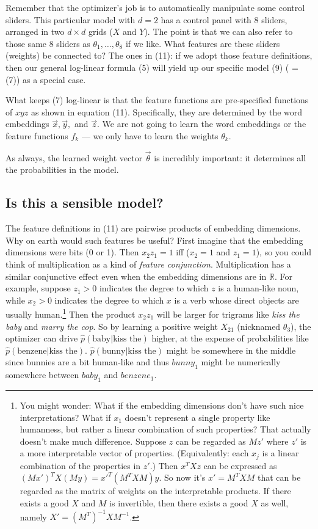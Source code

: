 Remember that the optimizer’s job is to automatically manipulate some control sliders. This particular model with $d=2$ has a control panel with 8 sliders, arranged in two $d \times d$ grids ($X$ and $Y$). The point is that we can also refer to those same 8 sliders as $\theta_1,\ldots,\theta_8$ if we like. What features are these sliders (weights) be connected to? The ones in (11): if we adopt those feature definitions, then our general log-linear formula (5) will yield up our specific model (9) ( = (7)) as a special case. 

What keeps (7) log-linear is that the feature functions are pre-specified functions of $xyz$ as shown in equation (11). Specifically, they are determined by the word embeddings $\vec{x}, \vec{y},$ and $\vec{z}$. We are not going to learn the word embeddings or the feature functions $f_k$ — we only have to learn the weights $\theta_k$.  

As always, the learned weight vector $\vec{\theta}$ is incredibly important: it determines all the probabilities in the model.  

\subsection*{Is this a sensible model?}
The feature definitions in (11) are pairwise products of embedding dimensions. Why on earth would such features be useful? First imagine that the embedding dimensions were bits (0 or 1). Then $x_2z_1=1$ iff ($x_2=1$ and $z_1=1$), so you could think of multiplication as a kind of \textit{feature conjunction}. Multiplication has a similar conjunctive effect even when the embedding dimensions are in $\mathbb{R}$. For example, suppose $z_1>0$ indicates the degree to which $z$ is a human-like noun, while $x_2>0$ indicates the degree to which $x$ is a verb whose direct objects are usually human.\footnote{You might wonder: What if the embedding dimensions don’t have such nice interpretations? What if $x_1$ doesn’t represent a single property like humanness, but rather a linear combination of such properties? That actually doesn’t make much difference. Suppose $z$ can be regarded as $Mz'$ where $z'$ is a more interpretable vector of properties. (Equivalently: each $x_j$ is a linear combination of the properties in $z'$.) Then $x^T X z$ can be expressed as $(Mx')^T X (My) = x'^T (M^T X M) y$. So now it’s $x' = M^T X M$ that can be regarded as the matrix of weights on the interpretable products. If there exists a good $X$ and $M$ is invertible, then there exists a good $X$ as well, namely $X' = (M^T)^{-1} X M^{-1}$.} Then the product $x_2 z_1$ will be larger for trigrams like \textit{kiss the baby} and \textit{marry the cop}. So by learning a positive weight $X_{21}$ (nicknamed $\theta_3$), the optimizer can drive $\hat{p}(\text{baby}|\text{kiss the})$ higher, at the expense of probabilities like $\hat{p}(\text{benzene}|\text{kiss the})$. $\hat{p}(\text{bunny}|\text{kiss the})$ might be somewhere in the middle since bunnies are a bit human-like and thus $bunny_1$ might be numerically somewhere between $baby_1$ and $benzene_1$.

